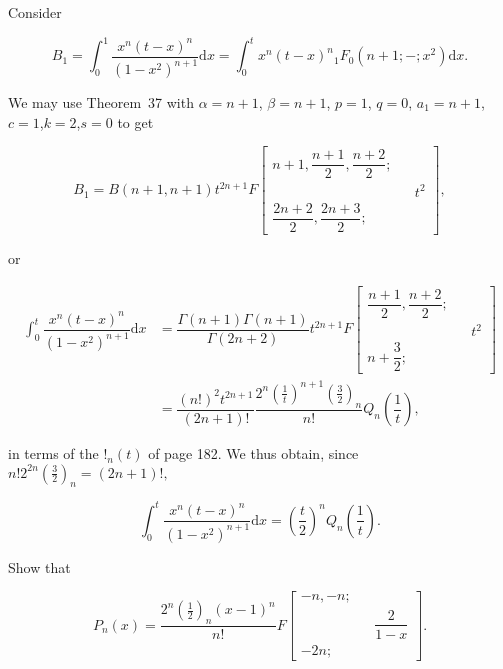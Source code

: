 \begin{solution}
Consider

$$B_1 = \displaystyle\int_0^1 \dfrac{x^n (t-x)^n}{(1-x^2)^{n+1}} \mathrm{d}x = \displaystyle\int_0^t x^n (t-x)^n {}_1F_0(n+1;-;x^2) \mathrm{d}x.$$

We may use Theorem~37 with $\alpha=n+1$, $\beta=n+1$, $p=1$, $q=0$, $a_1=n+1$,$c=1$,$k=2$,$s=0$ to get

$$B_1 = B(n+1,n+1) t^{2n+1} F \left[ \begin{array}{rlr}
n+1, \dfrac{n+1}{2}, \dfrac{n+2}{2}; & & \\
& & t^2 \\
\dfrac{2n+2}{2}, \dfrac{2n+3}{2}; & &
\end{array} \right],$$

or

$$\begin{array}{ll}
\displaystyle\int_0^t \dfrac{x^n (t-x)^n}{(1-x^2)^{n+1}} \mathrm{d}x &= \dfrac{\Gamma(n+1) \Gamma(n+1)}{\Gamma(2n+2)} t^{2n+1} F \left[ \begin{array}{rlr}
\dfrac{n+1}{2}, \dfrac{n+2}{2}; & & \\
& & t^2 \\
n+ \dfrac{3}{2}; & & 
\end{array} \right] \\
&= \dfrac{(n!)^2 t^{2n+1}}{(2n+1)!} \dfrac{2^n (\frac{1}{t})^{n+1} (\frac{3}{2})_n}{n!} Q_n \left( \dfrac{1}{t} \right),
\end{array}$$

in terms of the $!_n(t)$ of page 182. We thus obtain, since $n! 2^{2n} (\frac{3}{2})_n = (2n+1)!,$

$$\displaystyle\int_0^t \dfrac{x^n (t-x)^n}{(1-x^2)^{n+1}} \mathrm{d}x = \left( \dfrac{t}{2} \right)^n Q_n \left( \dfrac{1}{t} \right).$$
\end{solution}
\begin{problem}\label{problem14chapter10}
Show that

$$P_n(x) = \dfrac{2^n (\frac{1}{2})_n (x-1)^n}{n!} F \left[ \begin{array}{rlr}
-n,-n; & & \\
& & \dfrac{2}{1-x} \\
-2n; & &
\end{array} \right].$$
\end{problem}
